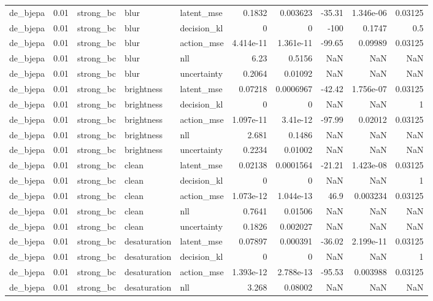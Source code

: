 \begin{tabular}{lrlllrrrrr}
de\_bjepa & 0.01 & strong\_bc & blur & latent\_mse & 0.1832 & 0.003623 & -35.31 & 1.346e-06 & 0.03125 \\
de\_bjepa & 0.01 & strong\_bc & blur & decision\_kl & 0 & 0 & -100 & 0.1747 & 0.5 \\
de\_bjepa & 0.01 & strong\_bc & blur & action\_mse & 4.414e-11 & 1.361e-11 & -99.65 & 0.09989 & 0.03125 \\
de\_bjepa & 0.01 & strong\_bc & blur & nll & 6.23 & 0.5156 & NaN & NaN & NaN \\
de\_bjepa & 0.01 & strong\_bc & blur & uncertainty & 0.2064 & 0.01092 & NaN & NaN & NaN \\
de\_bjepa & 0.01 & strong\_bc & brightness & latent\_mse & 0.07218 & 0.0006967 & -42.42 & 1.756e-07 & 0.03125 \\
de\_bjepa & 0.01 & strong\_bc & brightness & decision\_kl & 0 & 0 & NaN & NaN & 1 \\
de\_bjepa & 0.01 & strong\_bc & brightness & action\_mse & 1.097e-11 & 3.41e-12 & -97.99 & 0.02012 & 0.03125 \\
de\_bjepa & 0.01 & strong\_bc & brightness & nll & 2.681 & 0.1486 & NaN & NaN & NaN \\
de\_bjepa & 0.01 & strong\_bc & brightness & uncertainty & 0.2234 & 0.01002 & NaN & NaN & NaN \\
de\_bjepa & 0.01 & strong\_bc & clean & latent\_mse & 0.02138 & 0.0001564 & -21.21 & 1.423e-08 & 0.03125 \\
de\_bjepa & 0.01 & strong\_bc & clean & decision\_kl & 0 & 0 & NaN & NaN & 1 \\
de\_bjepa & 0.01 & strong\_bc & clean & action\_mse & 1.073e-12 & 1.044e-13 & 46.9 & 0.003234 & 0.03125 \\
de\_bjepa & 0.01 & strong\_bc & clean & nll & 0.7641 & 0.01506 & NaN & NaN & NaN \\
de\_bjepa & 0.01 & strong\_bc & clean & uncertainty & 0.1826 & 0.002027 & NaN & NaN & NaN \\
de\_bjepa & 0.01 & strong\_bc & desaturation & latent\_mse & 0.07897 & 0.000391 & -36.02 & 2.199e-11 & 0.03125 \\
de\_bjepa & 0.01 & strong\_bc & desaturation & decision\_kl & 0 & 0 & NaN & NaN & 1 \\
de\_bjepa & 0.01 & strong\_bc & desaturation & action\_mse & 1.393e-12 & 2.788e-13 & -95.53 & 0.003988 & 0.03125 \\
de\_bjepa & 0.01 & strong\_bc & desaturation & nll & 3.268 & 0.08002 & NaN & NaN & NaN \\

\end{tabular}
